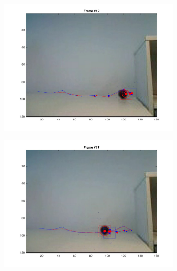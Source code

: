 \documentclass{ethz_report}
\begin{document}
\begin{figure}[h]
\begin{subfigure}[b]{.25\textwidth}
        \includegraphics[width=1\linewidth]{images/video3_particles_low_11}
    \end{subfigure}%
    \begin{subfigure}[b]{.25\textwidth}
        \centering
        \includegraphics[width=1\linewidth]{images/video3_particles_low_16}
    \end{subfigure}
    \begin{subfigure}[b]{.25\textwidth}
        \centering

\end{subfigure}
\end{figure}
\end{document}

